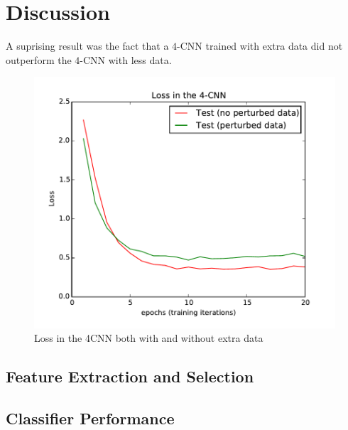 \documentclass[conference]{IEEEtran}
\begin{document}
\section{Discussion}


A suprising result was the fact that a $4$-CNN trained with extra data did not outperform the $4$-CNN with less data. 
\begin{figure}[h]
	\centering
	\includegraphics[scale=0.6]{4CNN_and_extraloss.pdf}
	\caption{Loss in the 4CNN both with and without extra data}
	\label{both_C4NNacc}
\end{figure}


\subsection{Feature Extraction and Selection}



\subsection{Classifier Performance}
\end{document}
